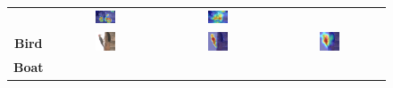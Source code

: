 \begin{figure}[ht]
\begin{tcolorbox}[colframe=black!60, colback=white, boxrule=0.8pt, arc=2pt, left=2pt, right=2pt, top=2pt, bottom=2pt]
\begin{tabular}{c c c c}
       & \includegraphics[width=0.20\textwidth,height=0.20\textwidth]
      {figures/val_cams/weclip/2011_000453_1.jpg}
       & \includegraphics[width=0.20\textwidth,height=0.20\textwidth]
      {figures/val_cams/ours/2011_000453_1.jpg}
      \\
      \textbf{Bird}
       & \includegraphics[width=0.20\textwidth,height=0.20\textwidth]
      {figures/originals/2011_001902.jpg}
       & \includegraphics[width=0.20\textwidth,height=0.20\textwidth]
      {figures/val_cams/weclip/2011_001902_2.jpg}
       & \includegraphics[width=0.20\textwidth,height=0.20\textwidth]
      {figures/val_cams/ours/2011_001902_2.jpg}
      \\
      \textbf{Boat}
       & \includegraphics[width=0.20\textwidth,height=0.20\textwidth]

\end{tabular}
\end{tcolorbox}
\end{figure}
